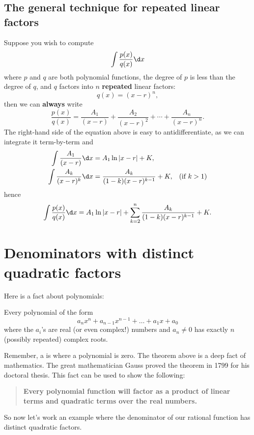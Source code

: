 \documentclass{ximera}
\begin{document}
\subsection{The general technique for repeated linear factors}

Suppose you wish to compute
\[
\int \frac{p(x)}{q(x)} \d x
\]
where $p$ and $q$ are both polynomial functions, the degree of $p$ is
less than the degree of $q$, and $q$ factors into $n$
\textbf{repeated} linear factors:
\[
q(x) = (x-r)^n,
\]
then we can \textbf{always} write
\[
\frac{p(x)}{q(x)}  = \frac{A_1}{(x-r)} + \frac{A_2}{(x-r)^2} + \cdots + \frac{A_n}{(x-r)^n}. 
\]
The right-hand side of the equation above is easy to
antidifferentiate, as we can integrate it term-by-term and
\begin{align*}
  \int \frac{A_1}{(x-r)} \d x &= A_1 \ln|x-r| + K,\\
  \int \frac{A_k}{(x-r)^k} \d x &= \frac{A_k}{(1-k)(x-r)^{k-1}}+ K, &\text{(if $k>1$)}
\end{align*}
hence
\[
\int \frac{p(x)}{q(x)} \d x = A_1 \ln|x-r|  + \sum_{k=2}^n \frac{A_k}{(1-k)(x-r)^{k-1}} + K.
\]






\section{Denominators with distinct quadratic factors}

Here is a fact about polynomials:

\begin{theorem}
  Every polynomial of the form
  \[
  a_n x^n + a_{n-1} x^{n-1} + \dots + a_1 x + a_0
  \]
  where the $a_i$'s are real (or even complex!) numbers and $a_n \ne 0$ has exactly
  $n$ (possibly repeated) complex roots.
\end{theorem}

Remember, a  is where a polynomial is zero. The theorem
above is a deep fact of mathematics. The great mathematician Gauss
proved the theorem in 1799 for his doctoral thesis. This fact can be
used to show the following:
\begin{quote}
  \textbf{Every polynomial function will factor as a product of linear
    terms and quadratic terms over the real numbers.}
\end{quote}

So now let's work an example where the denominator of our rational
function has distinct quadratic factors.
\end{document}
